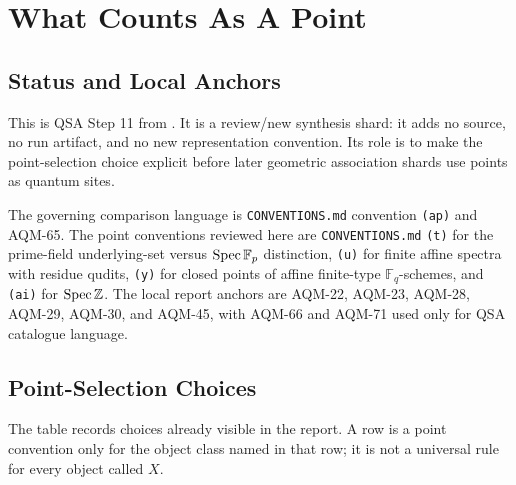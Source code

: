 
\section{What Counts As A Point}
\label{sec:qsa-what-counts-as-a-point}

\subsection{Status and Local Anchors}

This is QSA Step 11 from
.  It is a review/new
synthesis shard: it adds no source, no run artifact, and no new
representation convention.  Its role is to make the point-selection choice
explicit before later geometric association shards use points as quantum
sites.

The governing comparison language is \texttt{CONVENTIONS.md} convention
\texttt{(ap)} and AQM-65.  The point conventions reviewed here are
\texttt{CONVENTIONS.md} \texttt{(t)} for the prime-field underlying-set versus
\(\operatorname{Spec}\mathbb F_p\) distinction, \texttt{(u)} for finite affine spectra with
residue qudits, \texttt{(y)} for closed points of affine finite-type
\(\mathbb F_q\)-schemes, and \texttt{(ai)} for \(\operatorname{Spec}\mathbb Z\).  The local
report anchors are AQM-22, AQM-23, AQM-28, AQM-29, AQM-30, and AQM-45, with
AQM-66 and AQM-71 used only for QSA catalogue language.

\subsection{Point-Selection Choices}

The table records choices already visible in the report.  A row is a point
convention only for the object class named in that row; it is not a universal
rule for every object called \(X\).

